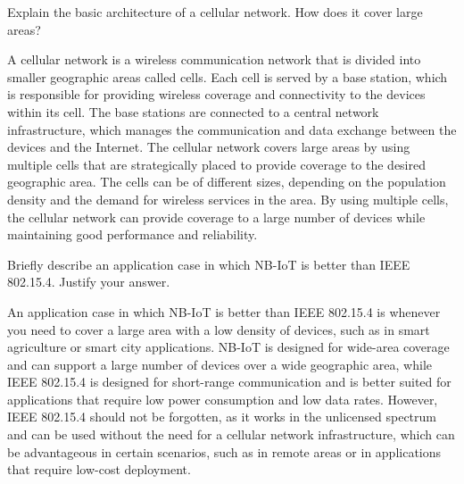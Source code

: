\begin{ejercicio}
    Explain the basic architecture of a cellular network. How does it cover large areas?

    A cellular network is a wireless communication network that is divided into smaller geographic areas called cells. Each cell is served by a base station, which is responsible for providing wireless coverage and connectivity to the devices within its cell. The base stations are connected to a central network infrastructure, which manages the communication and data exchange between the devices and the Internet. The cellular network covers large areas by using multiple cells that are strategically placed to provide coverage to the desired geographic area. The cells can be of different sizes, depending on the population density and the demand for wireless services in the area. By using multiple cells, the cellular network can provide coverage to a large number of devices while maintaining good performance and reliability.
\end{ejercicio}

\begin{ejercicio}
    Briefly describe an application case in which NB-IoT is better than IEEE 802.15.4. Justify your answer.

    An application case in which NB-IoT is better than IEEE 802.15.4 is whenever you need to cover a large area with a low density of devices, such as in smart agriculture or smart city applications. NB-IoT is designed for wide-area coverage and can support a large number of devices over a wide geographic area, while IEEE 802.15.4 is designed for short-range communication and is better suited for applications that require low power consumption and low data rates. However, IEEE 802.15.4 should not be forgotten, as it works in the unlicensed spectrum and can be used without the need for a cellular network infrastructure, which can be advantageous in certain scenarios, such as in remote areas or in applications that require low-cost deployment.
\end{ejercicio}

